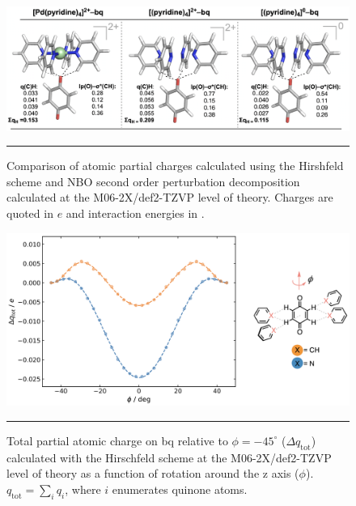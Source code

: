 \documentclass[../../main.tex]{subfiles}
\begin{document}
\begin{figure}[h!]
	\vspace{0.4cm}
	\centering
	\includegraphics[width=\textwidth]{3/da//figs/figS16}
	\vspace{0.2cm}
	\hrule
	\caption{Comparison of atomic partial charges calculated using the Hirshfeld scheme and NBO second order perturbation decomposition calculated at the M06-2X/def2-TZVP level of theory. Charges are quoted in $e$ and interaction energies in \kcal.}
	\label{fig::si_da_16}
\end{figure}


\begin{figure}[h!]
	\vspace{0.4cm}
	\centering
	\includegraphics[width=15cm]{3/da//figs/figS17}
	\vspace{0.2cm}
	\hrule
	\caption{Total partial atomic charge on bq relative to $\phi = -45^\circ$ ($\Delta q_\text{tot}$) calculated with the Hirschfeld scheme at the M06-2X/def2-TZVP level of theory as a function of rotation around the z axis ($\phi$). $q_\text{tot} = \sum_i q_i$, where $i$ enumerates quinone atoms.}
	\label{fig::si_da_17}
\end{figure}
\end{document}
